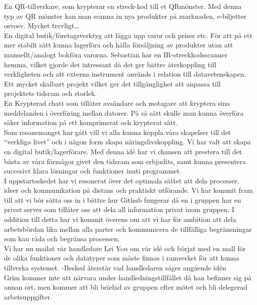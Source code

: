 \documentclass[11pt]{article}
\begin{document}
En QR-tillverkare, som krypterar en streck-kod till et QRmönster. Med denna typ av QR mönster kan man scanna in nya produkter på marknaden, e-biljetter osvosv. Mycket trevligt…\\

En digital butik/företagsverktyg att lägga upp varor och priser etc. För att på ett mer stabilt sätt kunna lagerföra och hålla försäljning av produkter utan att manuellt/analogt bokföra varorna. Sebastian har en IR-streckkodsscanner hemma, vilket gjorde det intressant då det ger bättre återkoppling till verkligheten och att externa instrument används i relation till datavetenskapen. Ett mycket skalbart projekt vilket ger det tillgänglighet att anpassa till projektets tidsram och storlek.\\

En Krypterad chatt som tillåter avsändare och motagare att kryptera sina meddelanden i överföring mellan datorer. På så sätt skulle man kunna överföra säker information på ett komprimerat och krypterat sätt.\\

Som resonemanget har gått vill vi alla kunna koppla våra skapelser till det “verkliga livet” och i någon form skapa näringslivskoppling. Vi har valt att skapa en digital butik/lagerförare. Med denna idé har vi chansen att prestera till det bästa av våra förmågor givet den tidsram som erbjudits, samt kunna presentera succesivt klara lösningar och funktioner inuti programmet.\\

I uppstartsskedet har vi resonerat över det optimala sättet att dela processer, ideer och kommunikation på distans och praktiskt utförande. Vi har kommit fram till att vi bör sätta oss in i bättre hur Github fungerar då en i gruppen har en privat server som tillåter oss att dela all information privat inom gruppen. I addition till detta har vi kommit överens om att vi har för ambition att dela arbetsbördan lika mellan alla parter och kommunicera de tillfälliga begränsningar som kan råda och begränsa processen.\\

Vi har nu mailat vår handledare Lei You om vår idé och börjat med en mall för de olika funktioner och datatyper som måste finnas i ramverket för att kunna tillverka systemet.
-Besked återstår vad handledaren säger angående idén\\

Grim kommer inte att närvara under handledningstillfället då han befinner sig på annan ort, men kommer att bli briefad av gruppen efter mötet och bli delegerad arbetsuppgifter.\\\\
\end{document}
